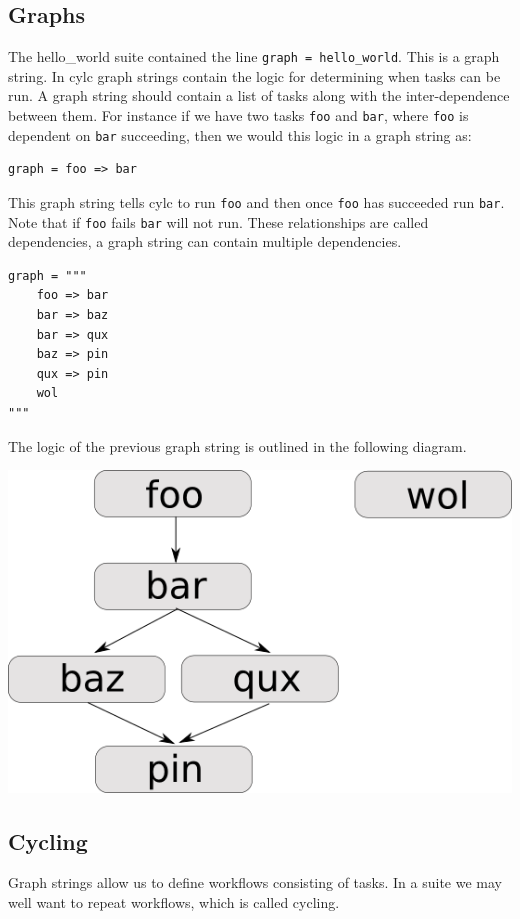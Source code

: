 \subsection{Graphs}

The hello\_world suite contained the line
\lstinline{graph = hello_world}. This is a graph string. In cylc
graph strings contain the logic for determining when tasks can be run. A graph
string should contain a list of tasks along with the inter-dependence between
them. For instance if we have two tasks \lstinline{foo} and \lstinline{bar},
where \lstinline{foo} is dependent on \lstinline{bar} succeeding, then we
would this logic in a graph string as:

\begin{lstlisting}[language=suiterc]
graph = foo => bar
\end{lstlisting}

This graph string tells cylc to run \lstinline{foo} and then once
\lstinline{foo} has succeeded run \lstinline{bar}. Note that if
\lstinline{foo} fails \lstinline{bar} will not run. These relationships are
called dependencies, a graph string can contain multiple dependencies.

\begin{lstlisting}[language=suiterc]
graph = """
    foo => bar
    bar => baz
    bar => qux
    baz => pin
    qux => pin
    wol
"""
\end{lstlisting}


The logic of the previous graph string is outlined in the following diagram.

\begin{center}
    \includegraphics[width=0.4\columnwidth]{resources/tex/cylc-graph}
\end{center}


\subsection{Cycling}

Graph strings allow us to define workflows consisting of tasks. In a suite we
may well want to repeat workflows, which is called cycling.

